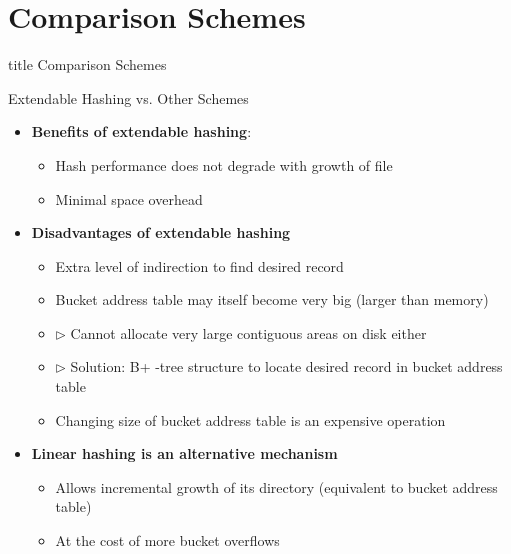 \documentclass[aspectratio=169, xcolor=dvipsnames]{beamer}
\begin{document}
\section{Comparison Schemes}
\begin{frame}
  \vfill
  \centering
  \begin{beamercolorbox}[sep=8pt,center,shadow=true,rounded=true]{title}
    Comparison Schemes\par%
  \end{beamercolorbox}
  \vfill
\end{frame}

\begin{frame}{Extendable Hashing vs. Other Schemes}
    \begin{itemize}[<+->]
        \item \textbf{Benefits of extendable hashing}:
        \begin{itemize}[<+->]
            \item Hash performance does not degrade with growth of file
            \item Minimal space overhead
        \end{itemize}
        \item \textbf{Disadvantages of extendable hashing}
        \begin{itemize}[<+->]
            \item Extra level of indirection to find desired record
            \item Bucket address table may itself become very big (larger than memory)
            \item $\triangleright$ Cannot allocate very large contiguous areas on disk either
            \item $\triangleright$ Solution: B+ -tree structure to locate desired record in bucket address table
            \item Changing size of bucket address table is an expensive operation
        \end{itemize}
        \item \textbf{Linear hashing is an alternative mechanism}
        \begin{itemize}[<+->]
            \item Allows incremental growth of its directory (equivalent to bucket address table)
            \item At the cost of more bucket overflows
        \end{itemize}
    \end{itemize}
\end{frame}
\end{document}
